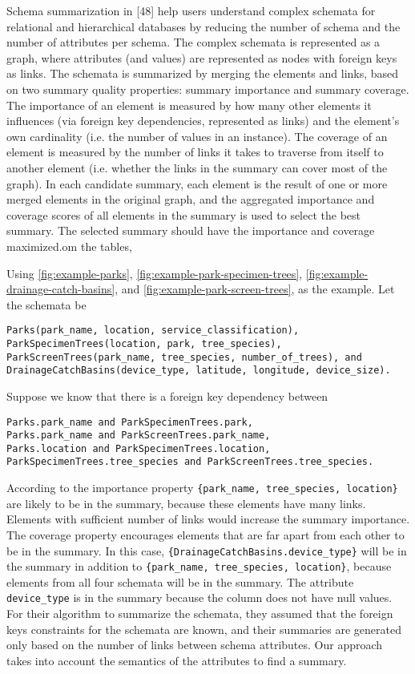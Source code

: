 Schema summarization in \cite{Yu2006Schema}[48] help users understand complex schemata for relational and hierarchical databases by reducing the number of schema and the number of attributes per schema. The complex schemata is represented as a graph, where attributes (and values) are represented as nodes with foreign keys as links. The schemata is summarized by merging the elements and links, based on two summary quality properties: summary importance and summary coverage. The importance of an element is measured by how many other elements it influences (via foreign key dependencies, represented as links) and the element's own cardinality (i.e. the number of values in an instance). The coverage of an element is measured by the number of links it takes to traverse from itself to another element (i.e. whether the links in the summary can cover most of the graph). In each candidate summary, each element is the result of one or more merged elements in the original graph, and the aggregated importance and coverage scores of all elements in the summary is used to select the best summary. The selected summary should have the importance and coverage maximized.om the tables,

Using \autoref{fig:example-parks}, \autoref{fig:example-park-specimen-trees}, \autoref{fig:example-drainage-catch-basins}, and \autoref{fig:example-park-screen-trees}, as the example. Let the schemata be
\begin{lstlisting}
Parks(park_name, location, service_classification),
ParkSpecimenTrees(location, park, tree_species),
ParkScreenTrees(park_name, tree_species, number_of_trees), and DrainageCatchBasins(device_type, latitude, longitude, device_size).
\end{lstlisting}

Suppose we know that there is a foreign key dependency between
\begin{lstlisting}
Parks.park_name and ParkSpecimenTrees.park,
Parks.park_name and ParkScreenTrees.park_name,
Parks.location and ParkSpecimenTrees.location,
ParkSpecimenTrees.tree_species and ParkScreenTrees.tree_species.
\end{lstlisting}

According to the importance property \verb+{park_name, tree_species, location}+ are likely to be in the summary, because these elements have many links. Elements with sufficient number of links would increase the summary importance. The coverage property encourages elements that are far apart from each other to be in the summary. In this case, \verb+{DrainageCatchBasins.device_type}+ will be in the summary in addition to \verb+{park_name, tree_species, location}+, because elements from all four schemata will be in the summary. The attribute \verb+device_type+ is in the summary because the column does not have null values. For their algorithm to summarize the schemata, they assumed that the foreign keys constraints for the schemata are known, and their summaries are generated only based on the number of links between schema attributes. Our approach takes into account the semantics of the attributes to find a summary.

